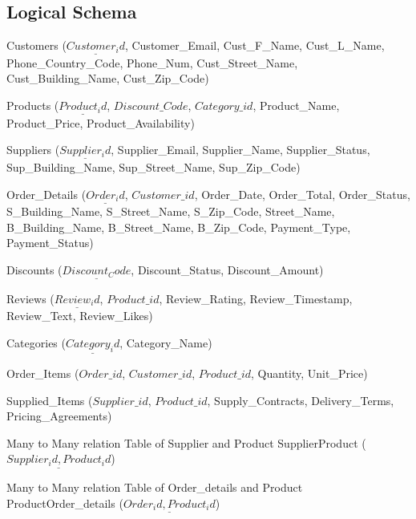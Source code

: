 \documentclass[
]{article}
\begin{document}
\hypertarget{logical-schema}{%
\subsection{Logical Schema}\label{logical-schema}}

Customers (\(\underline{Customer_id}\), Customer\_Email, Cust\_F\_Name,
Cust\_L\_Name, Phone\_Country\_Code, Phone\_Num, Cust\_Street\_Name,
Cust\_Building\_Name, Cust\_Zip\_Code)

Products (\(\underline{Product_id}\), \({\textit{Discount_Code}}\),
\({\textit{Category_id}}\), Product\_Name, Product\_Price,
Product\_Availability)

Suppliers (\(\underline{Supplier_id}\), Supplier\_Email, Supplier\_Name,
Supplier\_Status, Sup\_Building\_Name, Sup\_Street\_Name,
Sup\_Zip\_Code)

Order\_Details (\(\underline{Order_id}\), \({\textit{Customer_id}}\),
Order\_Date, Order\_Total, Order\_Status, S\_Building\_Name,
S\_Street\_Name, S\_Zip\_Code, Street\_Name, B\_Building\_Name,
B\_Street\_Name, B\_Zip\_Code, Payment\_Type, Payment\_Status)

Discounts (\(\underline{Discount_Code}\), Discount\_Status,
Discount\_Amount)

Reviews (\(\underline{Review_id}\), \({\textit{Product_id}}\),
Review\_Rating, Review\_Timestamp, Review\_Text, Review\_Likes)

Categories (\(\underline{Category_id}\), Category\_Name)

Order\_Items (\({\textit{Order_id}}\), \({\textit{Customer_id}}\),
\({\textit{Product_id}}\), Quantity, Unit\_Price)

Supplied\_Items (\(\textit{Supplier_id}\), \({\textit{Product_id}}\),
Supply\_Contracts, Delivery\_Terms, Pricing\_Agreements)

Many to Many relation Table of Supplier and Product SupplierProduct
(\(\underline{Supplier_id,Product_id}\))

Many to Many relation Table of Order\_details and Product
ProductOrder\_details (\(\underline{Order_id, Product_id}\))
\end{document}
